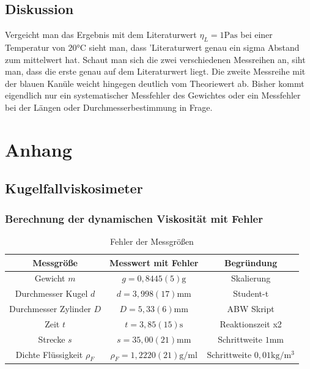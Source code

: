 \documentclass[11pt, a4paper]{article}
\begin{document}
    \subsection{Diskussion}
    Vergeicht man das Ergebnis mit dem Literaturwert $\eta_L = 1 \si{\pascal\second}$ \cite[Abb. 8]{VIS} bei einer Temperatur
    von $20 \si{\celsius}$ sieht man, dass 'Literaturwert genau ein sigma Abstand zum mittelwert hat.
    Schaut man sich die zwei verschiedenen Messreihen an, siht man, dass die erste genau auf dem Literaturwert
    liegt. Die zweite Messreihe mit der blauen Kanüle weicht hingegen deutlich vom Theoriewert ab.
    Bisher kommt eigendlich nur ein systematischer Messfehler des Gewichtes oder ein Messfehler bei der Längen
    oder Durchmesserbestimmung in Frage. 



    \section{Anhang}
    \subsection{Kugelfallviskosimeter}

    \subsubsection{Berechnung der dynamischen Viskosität mit Fehler} \label{sec:dynvisc}
    
    \begin{table}
       \begin{adjustwidth}{-5cm}{-5cm}
            \centering
            \begin{tabular}{c c c}
                Messgröße & Messwert mit Fehler & Begründung \\ \hline
                
                Gewicht $m$ & $g = 0,8445(5) \si{\gram}$ & Skalierung \\
                Durchmesser Kugel $d$ & $d = 3,998(17) \si{\milli\meter}$ & Student-t \\
                Durchmesser Zylinder $D$ & $D = 5,33(6) \si{\milli\meter}$ & ABW Skript \cite[Tabelle 6]{ABW} \\
                Zeit $t$ & $t = 3,85(15) \si{\second}$ & Reaktionszeit x2\\
                Strecke $s$ & $s = 35,00(21) \si{\milli\metre}$ & Schrittweite $1 \si{\milli\metre}$ \\
                Dichte Flüssigkeit $\rho_F$ & $\rho_F = 1,2220(21)  \si{\gram\per\milli\litre}$ & Schrittweite $0,01 \si{\kilogram\per\cubic\metre}$ \\

            \end{tabular}
        \end{adjustwidth}
        \label{tab:errors}
        \caption[]{Fehler der Messgrößen}
    \end{table}
    
\end{document}
